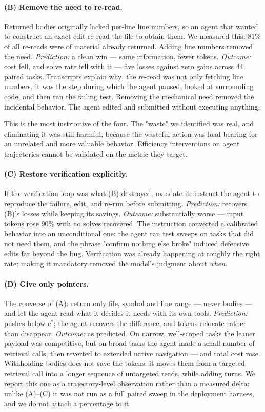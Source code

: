 \documentclass[11pt,letterpaper]{article}
\begin{document}
\paragraph{(B) Remove the need to re-read.}
Returned bodies originally lacked per-line line numbers, so an agent that wanted
to construct an exact edit re-read the file to obtain them. We measured this:
81\% of all re-reads were of material already returned. Adding line numbers
removed the need. \emph{Prediction:} a clean win --- same information, fewer
tokens. \emph{Outcome:} cost fell, and solve rate fell with it --- five losses
against zero gains across 44 paired tasks. Transcripts explain why: the re-read
was not only fetching line numbers, it was the step during which the agent
paused, looked at surrounding code, and then ran the failing test. Removing the
mechanical need removed the incidental behavior. The agent edited and submitted
without executing anything.

This is the most instructive of the four. The "waste" we identified was real, and
eliminating it was still harmful, because the wasteful action was load-bearing for
an unrelated and more valuable behavior. Efficiency interventions on agent
trajectories cannot be validated on the metric they target.

\paragraph{(C) Restore verification explicitly.}
If the verification loop was what (B) destroyed, mandate it: instruct the agent
to reproduce the failure, edit, and re-run before submitting. \emph{Prediction:}
recovers (B)'s losses while keeping its savings. \emph{Outcome:} substantially
worse --- input tokens rose 90\% with no solves recovered. The instruction
converted a calibrated behavior into an unconditional one: the agent ran test
sweeps on tasks that did not need them, and the phrase "confirm nothing else
broke" induced defensive edits far beyond the bug. Verification was already
happening at roughly the right rate; making it mandatory removed the model's
judgment about \emph{when}.

\paragraph{(D) Give only pointers.}
The converse of (A): return only file, symbol and line range --- never bodies ---
and let the agent read what it decides it needs with its own tools.
\emph{Prediction:} pushes below $c^{*}$; the agent recovers the difference, and
tokens relocate rather than disappear. \emph{Outcome:} as predicted. On narrow,
well-scoped tasks the leaner payload was competitive, but on broad tasks the
agent made a small number of retrieval calls, then reverted to extended native
navigation --- and total cost rose. Withholding bodies does not save the tokens;
it moves them from a targeted retrieval call into a longer sequence of untargeted
reads, while adding turns. We report this one as a trajectory-level observation
rather than a measured delta: unlike (A)--(C) it was not run as a full paired
sweep in the deployment harness, and we do not attach a percentage to it.
\end{document}
